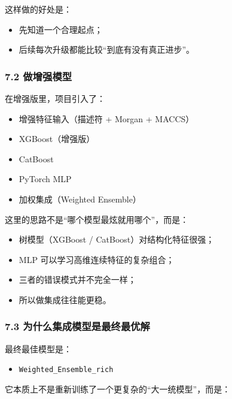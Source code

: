\documentclass[
  ,
]{ctexart}
\providecommand{\tightlist}{%
  \setlength{\itemsep}{0pt}\setlength{\parskip}{0pt}}
\begin{document}
这样做的好处是：

\begin{itemize}
\tightlist
\item
  先知道一个合理起点；
\item
  后续每次升级都能比较``到底有没有真正进步''。
\end{itemize}

\hypertarget{ux505aux589eux5f3aux6a21ux578b}{%
\subsubsection{7.2 做增强模型}\label{ux505aux589eux5f3aux6a21ux578b}}

在增强版里，项目引入了：

\begin{itemize}
\tightlist
\item
  增强特征输入（描述符 + Morgan + MACCS）
\item
  XGBoost（增强版）
\item
  CatBoost
\item
  PyTorch MLP
\item
  加权集成（Weighted Ensemble）
\end{itemize}

这里的思路不是``哪个模型最炫就用哪个''，而是：

\begin{itemize}
\tightlist
\item
  树模型（XGBoost / CatBoost）对结构化特征很强；
\item
  MLP 可以学习高维连续特征的复杂组合；
\item
  三者的错误模式并不完全一样；
\item
  所以做集成往往能更稳。
\end{itemize}

\hypertarget{ux4e3aux4ec0ux4e48ux96c6ux6210ux6a21ux578bux662fux6700ux7ec8ux6700ux4f18ux89e3}{%
\subsubsection{7.3
为什么集成模型是最终最优解}\label{ux4e3aux4ec0ux4e48ux96c6ux6210ux6a21ux578bux662fux6700ux7ec8ux6700ux4f18ux89e3}}

最终最佳模型是：

\begin{itemize}
\tightlist
\item
  \texttt{Weighted\_Ensemble\_rich}
\end{itemize}

它本质上不是重新训练了一个更复杂的``大一统模型''，而是：
\end{document}
